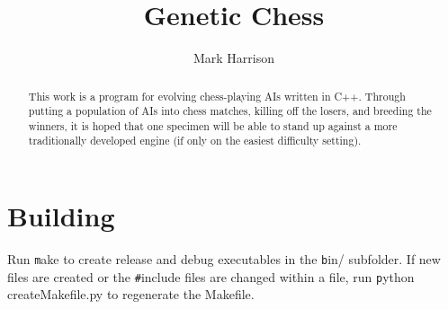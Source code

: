 \documentclass[letter]{article}
\title{Genetic Chess}
\author{Mark Harrison}
\newcommand{\cpp}{C{\nobreak +}{\nobreak +}}
\newcommand{\code}[1]{{\texttt #1}}
\renewcommand\_{\textunderscore\allowbreak}
\begin{document}
\maketitle

\begin{abstract}
This work is a program for evolving chess-playing AIs written in \cpp.  Through putting a population of AIs into chess matches, killing off the losers, and breeding the winners, it is hoped that one specimen will be able to stand up against a more traditionally developed engine (if only on the easiest difficulty setting).
\end{abstract}

\tableofcontents{}


\section{Building}
Run \code{make} to create release and debug executables in the \code{bin/} subfolder. If new files are created or the \code{\#include} files are changed within a file, run \code{python create\_Makefile.py} to regenerate the Makefile.
\end{document}
